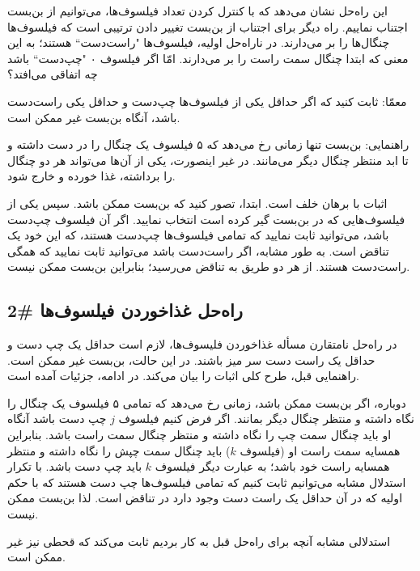 \documentclass{book}
\newcommand{\clearemptydoublepage}{}%
\begin{document}
    

    این راه‌حل نشان می‌دهد که با کنترل کردن تعداد فیلسوف‌ها، می‌توانیم از بن‌بست اجتناب نماییم. 
    راه دیگر برای اجتناب از بن‌بست تغییر دادن ترتیبی است  که فیلسوف‌ها چنگال‌ها را بر می‌دارند. 
    در ناراه‌حل اولیه، فیلسوف‌ها "راست‌دست`` هستند؛ به این معنی که ابتدا چنگال سمت راست را بر می‌دارند. 
    امّا اگر فیلسوف ۰ "چپ‌دست`` باشد چه اتفاقی می‌افتد؟‌

    معمّا: ثابت کنید که اگر حداقل یکی از فیلسوف‌ها چپ‌دست و حداقل یکی راست‌دست باشد، آنگاه بن‌بست غیر ممکن است. 

    راهنمایی: بن‌بست تنها زمانی رخ می‌دهد که ۵ فیلسوف یک چنگال را در دست داشته و تا ابد منتظر چنگال دیگر می‌مانند. 
    در غیر اینصورت، یکی از آن‌ها می‌تواند هر دو چنگال را برداشته، غذا خورده و خارج شود. 

    اثبات با برهان خلف است.  ابتدا، تصور کنید که بن‌بست ممکن باشد. 
    سپس یکی از فیلسوف‌هایی که در بن‌بست گیر کرده است انتخاب نمایید. 
    اگر آن فیلسوف چپ‌دست باشد،‌ می‌توانید ثابت نمایید که تمامی‌ فیلسوف‌ها چپ‌دست هستند، که این خود یک تناقض است. 
    به طور مشابه، اگر راست‌دست باشد می‌توانید ثابت نمایید که همگی راست‌دست هستند. از هر دو طریق به تناقض می‌رسید؛ بنابراین 
    بن‌بست ممکن نیست. 
    

\clearemptydoublepage
\subsection{راه‌حل غذاخوردن فیلسوف‌ها \#2}

    در راه‌حل نامتقارن مسأله غذاخوردن فلیسوف‌ها، لازم است حداقل یک چپ دست و  حداقل یک راست دست سر میز باشند. 
    در این حالت، بن‌بست غیر ممکن است. راهنمایی قبل، طرح کلی اثبات را بیان می‌کند.
    در ادامه، جزئیات آمده است. 

    دوباره، اگر بن‌بست ممکن باشد، زمانی رخ می‌دهد که تمامی ۵ فیلسوف یک چنگال را نگاه داشته و منتظر چنگال دیگر بمانند. 
    اگر فرض کنیم فیلسوف $j$ چپ دست باشد آنگاه او باید چنگال سمت چپ را نگاه داشته و منتظر چنگال سمت راست باشد. 
    بنابراین همسایه سمت راست او (فیلسوف $k$) باید چنگال سمت چپش را نگاه داشته و منتظر همسایه راست خود باشد؛ به عبارت دیگر 
    فیلسوف $k$ باید چپ دست باشد. 
    با تکرار استدلال مشابه می‌توانیم ثابت کنیم که تمامی فیلسوف‌ها چپ دست هستند که با حکم اولیه که در آن 
    حداقل یک راست دست وجود دارد در تناقض است. لذا بن‌بست ممکن نیست. 

    استدلالی مشابه آنچه برای راه‌حل قبل به کار بردیم ثابت می‌کند که قحطی نیز غیر ممکن است. 
\end{document}
